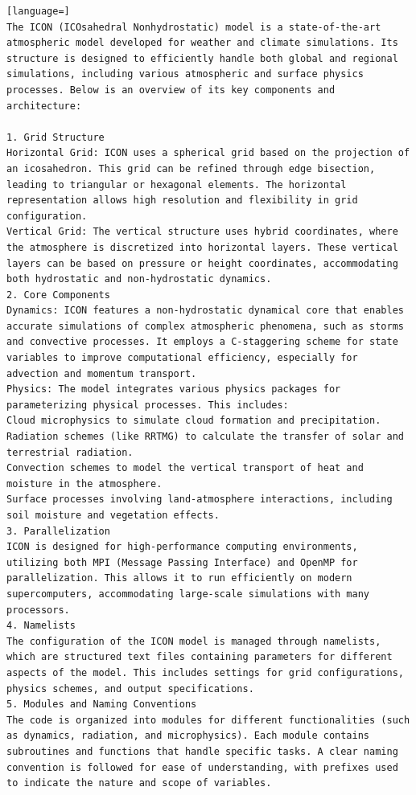 \begin{lstlisting}[language=]
The ICON (ICOsahedral Nonhydrostatic) model is a state-of-the-art atmospheric model developed for weather and climate simulations. Its structure is designed to efficiently handle both global and regional simulations, including various atmospheric and surface physics processes. Below is an overview of its key components and architecture:

1. Grid Structure
Horizontal Grid: ICON uses a spherical grid based on the projection of an icosahedron. This grid can be refined through edge bisection, leading to triangular or hexagonal elements. The horizontal representation allows high resolution and flexibility in grid configuration.
Vertical Grid: The vertical structure uses hybrid coordinates, where the atmosphere is discretized into horizontal layers. These vertical layers can be based on pressure or height coordinates, accommodating both hydrostatic and non-hydrostatic dynamics.
2. Core Components
Dynamics: ICON features a non-hydrostatic dynamical core that enables accurate simulations of complex atmospheric phenomena, such as storms and convective processes. It employs a C-staggering scheme for state variables to improve computational efficiency, especially for advection and momentum transport.
Physics: The model integrates various physics packages for parameterizing physical processes. This includes:
Cloud microphysics to simulate cloud formation and precipitation.
Radiation schemes (like RRTMG) to calculate the transfer of solar and terrestrial radiation.
Convection schemes to model the vertical transport of heat and moisture in the atmosphere.
Surface processes involving land-atmosphere interactions, including soil moisture and vegetation effects.
3. Parallelization
ICON is designed for high-performance computing environments, utilizing both MPI (Message Passing Interface) and OpenMP for parallelization. This allows it to run efficiently on modern supercomputers, accommodating large-scale simulations with many processors.
4. Namelists
The configuration of the ICON model is managed through namelists, which are structured text files containing parameters for different aspects of the model. This includes settings for grid configurations, physics schemes, and output specifications.
5. Modules and Naming Conventions
The code is organized into modules for different functionalities (such as dynamics, radiation, and microphysics). Each module contains subroutines and functions that handle specific tasks. A clear naming convention is followed for ease of understanding, with prefixes used to indicate the nature and scope of variables.

\end{lstlisting}
